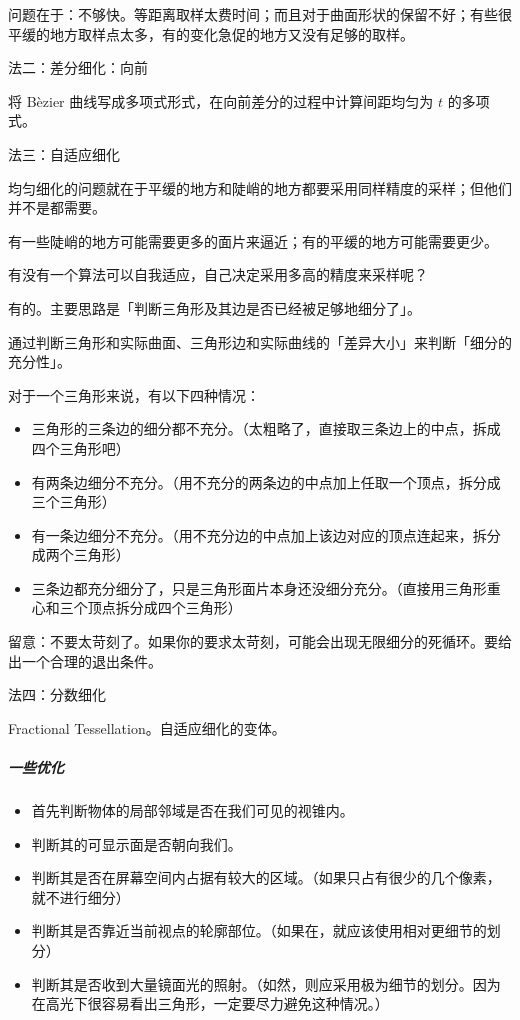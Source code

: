 \documentclass[
]{article}
\begin{document}
问题在于：不够快。等距离取样太费时间；而且对于曲面形状的保留不好；有些很平缓的地方取样点太多，有的变化急促的地方又没有足够的取样。

法二：差分细化：向前

将 Bèzier 曲线写成多项式形式，在向前差分的过程中计算间距均匀为 \(t\)
的多项式。

法三：自适应细化

均匀细化的问题就在于平缓的地方和陡峭的地方都要采用同样精度的采样；但他们并不是都需要。

有一些陡峭的地方可能需要更多的面片来逼近；有的平缓的地方可能需要更少。

有没有一个算法可以自我适应，自己决定采用多高的精度来采样呢？

有的。主要思路是「判断三角形及其边是否已经被足够地细分了」。

通过判断三角形和实际曲面、三角形边和实际曲线的「差异大小」来判断「细分的充分性」。

对于一个三角形来说，有以下四种情况：

\begin{itemize}
\item
  三角形的三条边的细分都不充分。（太粗略了，直接取三条边上的中点，拆成四个三角形吧）
\item
  有两条边细分不充分。（用不充分的两条边的中点加上任取一个顶点，拆分成三个三角形）
\item
  有一条边细分不充分。（用不充分边的中点加上该边对应的顶点连起来，拆分成两个三角形）
\item
  三条边都充分细分了，只是三角形面片本身还没细分充分。（直接用三角形重心和三个顶点拆分成四个三角形）
\end{itemize}

留意：不要太苛刻了。如果你的要求太苛刻，可能会出现无限细分的死循环。要给出一个合理的退出条件。

法四：分数细化

Fractional Tessellation。自适应细化的变体。

\hypertarget{header-n126}{%
\subparagraph{一些优化}\label{header-n126}}

\begin{itemize}
\item
  首先判断物体的局部邻域是否在我们可见的视锥内。
\item
  判断其的可显示面是否朝向我们。
\item
  判断其是否在屏幕空间内占据有较大的区域。（如果只占有很少的几个像素，就不进行细分）
\item
  判断其是否靠近当前视点的轮廓部位。（如果在，就应该使用相对更细节的划分）
\item
  判断其是否收到大量镜面光的照射。（如然，则应采用极为细节的划分。因为在高光下很容易看出三角形，一定要尽力避免这种情况。）
\end{itemize}
\end{document}
